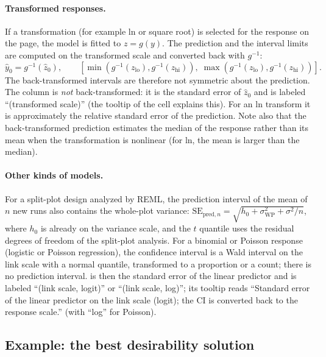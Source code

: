 \paragraph{Transformed responses.} If a transformation (for example ln or square root) is selected for the
response on the  page, the model is fitted to $z = g(y)$. The prediction and the interval limits are
computed on the transformed scale and converted back with $g^{-1}$:
\begin{equation}
  \hat y_0 = g^{-1}(\hat z_0), \qquad
  \left[\min\!\left(g^{-1}(z_\text{lo}), g^{-1}(z_\text{hi})\right),\;
        \max\!\left(g^{-1}(z_\text{lo}), g^{-1}(z_\text{hi})\right)\right].
  \label{eq:ch10-back}
\end{equation}
The back-transformed intervals are therefore not symmetric about the prediction. The column  is \emph{not} back-transformed: it is the standard error of $\hat z_0$ and is labeled ``(transformed scale)''
(the tooltip of the cell explains this). For an ln transform it is approximately the relative standard error of the
prediction. Note also that the back-transformed prediction estimates the median of the response rather than its
mean when the transformation is nonlinear (for ln, the mean is larger than the median).

\paragraph{Other kinds of models.} For a split-plot design analyzed by REML, the prediction interval of the mean of
$n$ new runs also contains the whole-plot variance: $\text{SE}_{\text{pred},n} = \sqrt{h_0 + \sigma^2_\text{WP} +
\sigma^2/n}$, where $h_0$ is already on the variance scale, and the $t$ quantile uses the residual degrees of
freedom of the split-plot analysis. For a binomial or Poisson response (logistic or Poisson regression), the confidence interval
is a Wald interval on the link scale with a normal quantile, transformed to a proportion or a count; there is no
prediction interval.  is then the standard error of the linear predictor and is labeled
``(link scale, logit)'' or ``(link scale, log)''; its tooltip reads ``Standard error of the linear predictor on the
link scale (logit); the CI is converted back to the response scale.'' (with ``log'' for Poisson).

\subsection{Example: the best desirability solution}

